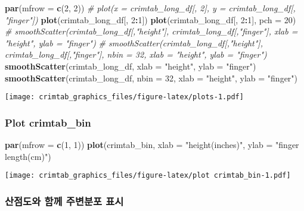 \documentclass[
]{article}
\newenvironment{Shaded}{\begin{snugshade}}{\end{snugshade}}
\newcommand{\CommentTok}[1]{\textcolor[rgb]{0.56,0.35,0.01}{\textit{#1}}}
\newcommand{\DataTypeTok}[1]{\textcolor[rgb]{0.13,0.29,0.53}{#1}}
\newcommand{\DecValTok}[1]{\textcolor[rgb]{0.00,0.00,0.81}{#1}}
\newcommand{\KeywordTok}[1]{\textcolor[rgb]{0.13,0.29,0.53}{\textbf{#1}}}
\newcommand{\NormalTok}[1]{#1}
\newcommand{\OperatorTok}[1]{\textcolor[rgb]{0.81,0.36,0.00}{\textbf{#1}}}
\newcommand{\StringTok}[1]{\textcolor[rgb]{0.31,0.60,0.02}{#1}}
\begin{document}
\begin{Shaded}
\begin{Highlighting}[]
\KeywordTok{par}\NormalTok{(}\DataTypeTok{mfrow =} \KeywordTok{c}\NormalTok{(}\DecValTok{2}\NormalTok{, }\DecValTok{2}\NormalTok{))}
\CommentTok{# plot(x = crimtab_long_df[, 2], y = crimtab_long_df[, "finger"])}
\KeywordTok{plot}\NormalTok{(crimtab_long_df[, }\DecValTok{2}\OperatorTok{:}\DecValTok{1}\NormalTok{])}
\KeywordTok{plot}\NormalTok{(crimtab_long_df[, }\DecValTok{2}\OperatorTok{:}\DecValTok{1}\NormalTok{], }
     \DataTypeTok{pch =} \DecValTok{20}\NormalTok{)}
\CommentTok{# smoothScatter(crimtab_long_df[,"height"], crimtab_long_df[,"finger"], xlab = "height", ylab = "finger")}
\CommentTok{# smoothScatter(crimtab_long_df[,"height"], crimtab_long_df[,"finger"], nbin = 32, xlab = "height", ylab = "finger")}
\KeywordTok{smoothScatter}\NormalTok{(crimtab_long_df, }
              \DataTypeTok{xlab =} \StringTok{"height"}\NormalTok{, }
              \DataTypeTok{ylab =} \StringTok{"finger"}\NormalTok{)}
\KeywordTok{smoothScatter}\NormalTok{(crimtab_long_df, }
              \DataTypeTok{nbin =} \DecValTok{32}\NormalTok{, }
              \DataTypeTok{xlab =} \StringTok{"height"}\NormalTok{, }
              \DataTypeTok{ylab =} \StringTok{"finger"}\NormalTok{)}
\end{Highlighting}
\end{Shaded}

\texttt{[image: crimtab\_graphics\_files/figure-latex/plots-1.pdf]}

\hypertarget{plot-crimtab_bin}{%
\subsubsection{Plot crimtab\_bin}\label{plot-crimtab_bin}}

\begin{Shaded}
\begin{Highlighting}[]
\KeywordTok{par}\NormalTok{(}\DataTypeTok{mfrow =} \KeywordTok{c}\NormalTok{(}\DecValTok{1}\NormalTok{, }\DecValTok{1}\NormalTok{))}
\KeywordTok{plot}\NormalTok{(crimtab_bin, }
     \DataTypeTok{xlab =} \StringTok{"height(inches)"}\NormalTok{, }
     \DataTypeTok{ylab =} \StringTok{"finger length(cm)"}\NormalTok{)}
\end{Highlighting}
\end{Shaded}

\texttt{[image: crimtab\_graphics\_files/figure-latex/plot crimtab\_bin-1.pdf]}

\hypertarget{uxc0b0uxc810uxb3c4uxc640-uxd568uxaed8-uxc8fcuxbcc0uxbd84uxd3ec-uxd45cuxc2dc}{%
\subsubsection{산점도와 함께 주변분포
표시}\label{uxc0b0uxc810uxb3c4uxc640-uxd568uxaed8-uxc8fcuxbcc0uxbd84uxd3ec-uxd45cuxc2dc}}
\end{document}
